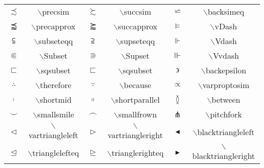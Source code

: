 \documentclass[UTF8]{ctexart}
\begin{document}
\begin{table}[H]
\begin{center}
\begin{tabular}{cccccc}
			$\precsim$  &  $\backslash$precsim  &  $\succsim$  & $\backslash$succsim  &  $\backsimeq$  & $\backslash$backsimeq  \\

			$\precapprox$  &  $\backslash$precapprox  &  $\succapprox$  & $\backslash$succapprox  &  $\vDash$  & $\backslash$vDash  \\
			
			$\subseteqq$  &  $\backslash$subseteqq  &  $\supseteqq$  & $\backslash$supseteqq  &  $\Vdash$  & $\backslash$Vdash  \\

			$\Subset$  &  $\backslash$Subset  &  $\Supset$  & $\backslash$Supset  &  $\Vvdash$  & $\backslash$Vvdash  \\

			$\sqsubset$  &  $\backslash$sqsubset  &  $\sqsubset$  & $\backslash$sqsubset  &  $\backepsilon$  & $\backslash$backepsilon  \\

			$\therefore$  &  $\backslash$therefore  &  $\because$  & $\backslash$because  &  $\varpropto$  & $\backslash$varproptosim  \\

			$\shortmid$  &  $\backslash$shortmid  &  $\shortparallel$  & $\backslash$shortparallel  &  $\between$  & $\backslash$between  \\

			$\smallsmile$  &  $\backslash$smallsmile  &  $\smallfrown$  & $\backslash$smallfrown  &  $\pitchfork$  & $\backslash$pitchfork  \\

			$\vartriangleleft$  &  $\backslash$vartriangleleft  &  $\vartriangleright$  & $\backslash$vartriangleright  &  $\blacktriangleleft$  & $\backslash$blacktriangleleft  \\

			$\trianglelefteq$  &  $\backslash$trianglelefteq  &  $\trianglerighteq$  & $\backslash$trianglerighteq  &  $\blacktriangleright$  & $\backslash$blacktriangleright  \\

				
		\end{tabular}
	\end{center}
\end{table}
\end{document}
